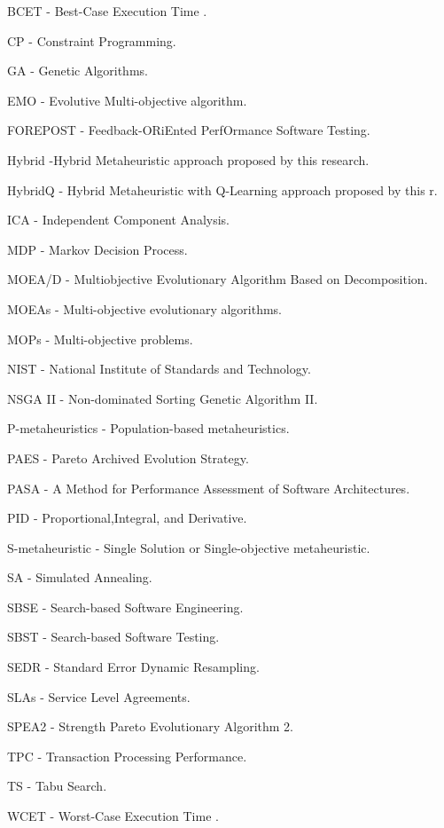 
\begin{description}
 \item BCET - Best-Case Execution Time .
 \item CP - Constraint Programming.
 \item GA - Genetic Algorithms.
 \item EMO - Evolutive Multi-objective algorithm.
 \item FOREPOST - Feedback-ORiEnted PerfOrmance Software Testing.
 \item Hybrid -Hybrid Metaheuristic approach proposed by this research.
 \item HybridQ - Hybrid Metaheuristic with Q-Learning approach proposed by this r.
 \item ICA - Independent Component Analysis.
 \item MDP - Markov Decision Process.
 \item MOEA/D - Multiobjective Evolutionary Algorithm Based on Decomposition.
 \item MOEAs - Multi-objective evolutionary algorithms. 
 \item MOPs - Multi-objective problems. 
 \item NIST -  National Institute of Standards and Technology. 
 \item NSGA II - Non-dominated Sorting Genetic Algorithm II.
 \item P-metaheuristics - Population-based metaheuristics.
 \item PAES - Pareto Archived Evolution Strategy.
 \item PASA - A Method for Performance Assessment of Software Architectures.
 \item PID - Proportional,Integral, and Derivative.
 \item S-metaheuristic - Single Solution or Single-objective metaheuristic.
 \item SA - Simulated Annealing.
 \item SBSE - Search-based Software Engineering.
 \item SBST - Search-based Software Testing. 
 \item SEDR - Standard Error Dynamic Resampling.
 \item SLAs - Service Level Agreements.
 \item SPEA2 - Strength Pareto Evolutionary Algorithm 2.
 \item TPC - Transaction Processing Performance.
 \item TS - Tabu Search.
 \item WCET - Worst-Case Execution Time .

 
\end{description}
